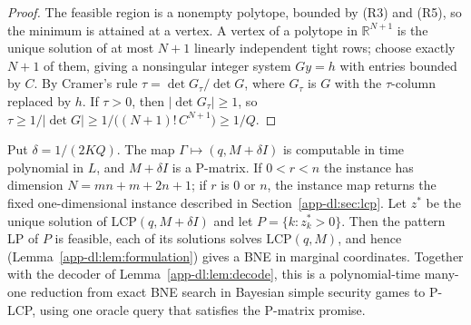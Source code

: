 \begin{proof}
The feasible region is a nonempty polytope, bounded by (R3) and (R5), so the minimum is attained at a
vertex. A vertex of a polytope in $\mathbb R^{N+1}$ is the unique solution of at most $N+1$ linearly
independent tight rows; choose exactly $N+1$ of them, giving a nonsingular integer system $Gy=h$ with
entries bounded by $C$. By Cramer's rule $\tau=\det G_\tau/\det G$, where $G_\tau$ is $G$ with the
$\tau$-column replaced by $h$. If $\tau>0$, then $|\det G_\tau|\ge1$, so
$\tau\ge1/|\det G|\ge1/\bigl((N+1)!\,C^{N+1}\bigr)\ge1/Q$.
\end{proof}

\begin{theorem}\label{app-dl:thm:main}\label{thm:direct-lcp}
\statusrefereed
Put $\delta=1/(2KQ)$. The map $\Gamma\mapsto(q,M+\delta I)$ is computable in time polynomial in $L$, and
$M+\delta I$ is a P-matrix. If $0<r<n$ the instance has dimension $N=mn+m+2n+1$; if $r$ is $0$ or $n$,
the instance map returns the fixed one-dimensional instance described in
Section~\ref{app-dl:sec:lcp}. Let $z^*$ be the unique solution of $\mathrm{LCP}(q,M+\delta I)$ and let
$P=\{k:z^*_k>0\}$. Then the pattern LP of $P$ is feasible, each of its solutions solves
$\mathrm{LCP}(q,M)$, and hence (Lemma~\ref{app-dl:lem:formulation}) gives a BNE in marginal
coordinates. Together with the decoder of Lemma~\ref{app-dl:lem:decode}, this is a polynomial-time
many-one reduction from exact BNE search in Bayesian simple security games to P-LCP, using one oracle
query that satisfies the P-matrix promise.
\end{theorem}

